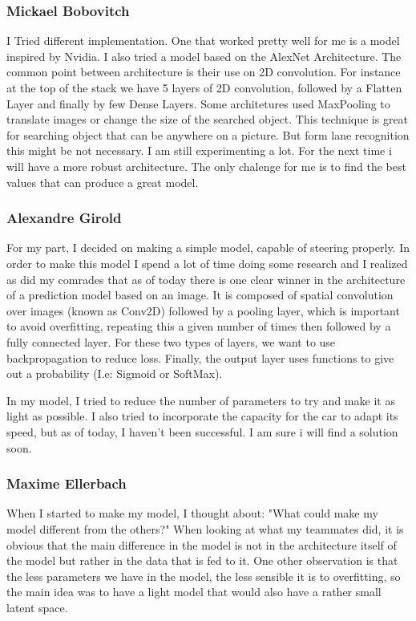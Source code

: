 \documentclass[12pt]{article}
\begin{document}
\subsubsection{Mickael Bobovitch}
I Tried different implementation. One that worked pretty well for me is a model inspired by Nvidia. I also tried a model based on the AlexNet Architecture. The common point between architecture is their use on 2D convolution. For instance at the top of the stack we have 5 layers of 2D convolution, followed by a Flatten Layer and finally by few Dense Layers. Some architetures used MaxPooling to translate images or change the size of the searched object. This technique is great for searching object that can be anywhere on a picture. But form lane recognition this might be not necessary. I am still experimenting a lot. For the next time i will have a more robust architecture. The only chalenge for me is to find the best values that can produce a great model.

\subsubsection{Alexandre Girold}
For my part, I decided on making a simple model, capable of steering properly. In order to make this model I spend a lot of time doing some research and I realized as did my comrades that as of today there is one clear winner in the architecture of a prediction model based on an image. 
It is composed of spatial convolution over images (known as Conv2D) followed by a pooling layer, which is important to avoid overfitting, repeating this a given number of times then followed by a fully connected layer. For these two types of layers, we want to use backpropagation to reduce loss. Finally, the output layer uses functions to give out a probability (I.e: Sigmoid or SoftMax).  

In my model, I tried to reduce the number of parameters to try and make it as light as possible. I also tried to incorporate the capacity for the car to adapt its speed, but as of today, I haven’t been successful. I am sure i will find a solution soon.

\newpage

\subsubsection{Maxime Ellerbach}
When I started to make my model, I thought about: "What could make my model different from the others?" When looking at what my teammates did, it is obvious that the main difference in the model is not in the architecture itself of the model but rather in the data that is fed to it. One other observation is that the less parameters we have in the model, the less sensible it is to overfitting, so the main idea was to have a light model that would also have a rather small latent space. \\
\end{document}
